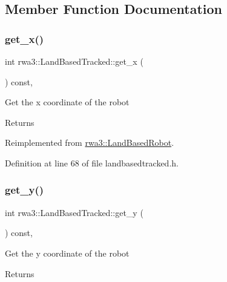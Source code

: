 \subsection{Member Function Documentation}
\mbox{\label{classrwa3_1_1_land_based_tracked_a9065f381181bef7d8a4c8f4061ef2cda}} 
\subsubsection{\texorpdfstring{get\+\_\+x()}{get\_x()}}
{\footnotesize\ttfamily int rwa3\+::\+Land\+Based\+Tracked\+::get\+\_\+x (\begin{DoxyParamCaption}{ }\end{DoxyParamCaption}) const\hspace{0.3cm}{\ttfamily [inline]}, {\ttfamily [virtual]}}

Get the x coordinate of the robot \begin{DoxyReturn}{Returns}

\end{DoxyReturn}


Reimplemented from \hyperlink{classrwa3_1_1_land_based_robot_af47bec53268bd409305d2f97f45411ab}{rwa3\+::\+Land\+Based\+Robot}.



Definition at line 68 of file landbasedtracked.\+h.

\mbox{\label{classrwa3_1_1_land_based_tracked_a11025bced4da296a2207e169fe328857}} 
\subsubsection{\texorpdfstring{get\+\_\+y()}{get\_y()}}
{\footnotesize\ttfamily int rwa3\+::\+Land\+Based\+Tracked\+::get\+\_\+y (\begin{DoxyParamCaption}{ }\end{DoxyParamCaption}) const\hspace{0.3cm}{\ttfamily [inline]}, {\ttfamily [virtual]}}

Get the y coordinate of the robot \begin{DoxyReturn}{Returns}

\end{DoxyReturn}


